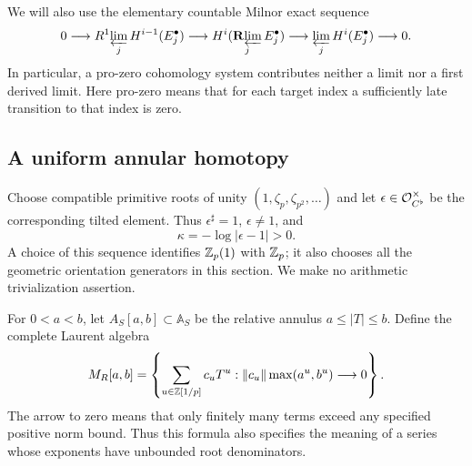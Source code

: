 We will also use the elementary countable Milnor exact sequence
\begin{equation}\label{eq:kum-milnor}
 0\longrightarrow R^1\!\varprojlim_j H^{i-1}(E_j^\bullet)
 \longrightarrow H^i(\mathop{\mathbf R\!\varprojlim}_j E_j^\bullet)
 \longrightarrow \varprojlim_j H^i(E_j^\bullet)
 \longrightarrow0.
\end{equation}
In particular, a pro-zero cohomology system contributes neither a
limit nor a first derived limit.  Here pro-zero means that for each
target index a sufficiently late transition to that index is zero.

\subsection{A uniform annular homotopy}

Choose compatible primitive roots of unity
$(1,\zeta_p,\zeta_{p^2},\ldots)$ and let
$\epsilon\in\mathcal O_{C^\flat}^{\times}$ be the corresponding tilted
element.  Thus $\epsilon^\sharp=1$, $\epsilon\ne1$, and
\[
 \kappa=-\log|\epsilon-1|>0.
\]
A choice of this sequence identifies $\mathbb Z_p(1)$ with $\mathbb Z_p$; it also
chooses all the geometric orientation generators in this section.
We make no arithmetic trivialization assertion.

For $0<a<b$, let $A_S[a,b]\subset\mathbb A_S$ be the relative
annulus $a\leq|T|\leq b$.  Define the complete Laurent algebra
\begin{equation}\label{eq:kum-annular-algebra}
 M_R[a,b]=\left\{
  \sum_{u\in\mathbb Z[1/p]}c_uT^u:
  \|c_u\|\max(a^u,b^u)\longrightarrow0
 \right\}.
\end{equation}
The arrow to zero means that only finitely many terms exceed any
specified positive norm bound.  Thus this formula also specifies the
meaning of a series whose exponents have unbounded root denominators.


